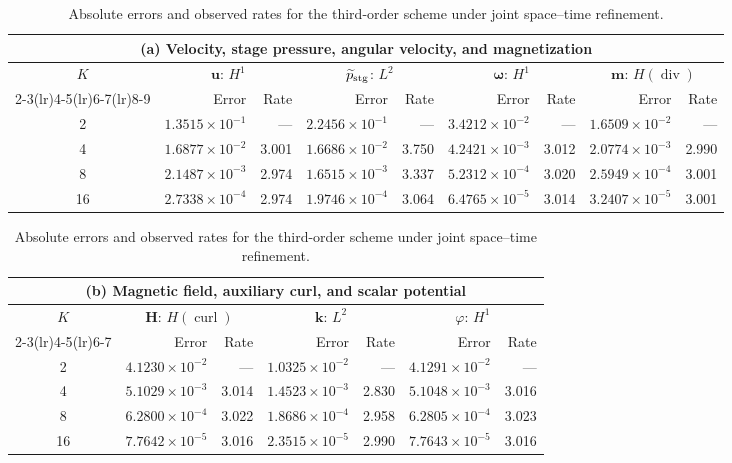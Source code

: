\documentclass[11pt,a4paper]{article}
\newcommand{\bs}{\boldsymbol}
\DeclareMathOperator{\curl}{curl}
\DeclareMathOperator{\ddiv}{div}
\newcommand{\Div}{\ddiv}
\newcommand{\pp}{\widetilde p}
\theoremstyle{definition}
\numberwithin{equation}{section}
\begin{document}
\begin{table}[H]
\centering
\caption{Absolute errors and observed rates for the third-order scheme under joint space--time refinement.}
\label{tab:third-order-absolute-errors}
\begingroup
\small
\setlength{\tabcolsep}{3.5pt}
\renewcommand{\arraystretch}{1.10}
\begin{tabular}{@{}c*{8}{r}@{}}
\toprule
\multicolumn{9}{c}{(a) Velocity, stage pressure, angular velocity, and magnetization}\\
\midrule
$K$ & \multicolumn{2}{c}{$\bs u$: $H^1$} & \multicolumn{2}{c}{$\pp_{\rm stg}$: $L^2$} & \multicolumn{2}{c}{$\bs\omega$: $H^1$} & \multicolumn{2}{c}{$\bs m$: $H(\Div)$}\\
\cmidrule(lr){2-3}\cmidrule(lr){4-5}\cmidrule(lr){6-7}\cmidrule(lr){8-9}
 & Error & Rate & Error & Rate & Error & Rate & Error & Rate\\
\midrule
2 & $1.3515\!\times\!10^{-1}$ & --- & $2.2456\!\times\!10^{-1}$ & --- & $3.4212\!\times\!10^{-2}$ & --- & $1.6509\!\times\!10^{-2}$ & ---\\
4 & $1.6877\!\times\!10^{-2}$ & 3.001 & $1.6686\!\times\!10^{-2}$ & 3.750 & $4.2421\!\times\!10^{-3}$ & 3.012 & $2.0774\!\times\!10^{-3}$ & 2.990\\
8 & $2.1487\!\times\!10^{-3}$ & 2.974 & $1.6515\!\times\!10^{-3}$ & 3.337 & $5.2312\!\times\!10^{-4}$ & 3.020 & $2.5949\!\times\!10^{-4}$ & 3.001\\
16 & $2.7338\!\times\!10^{-4}$ & 2.974 & $1.9746\!\times\!10^{-4}$ & 3.064 & $6.4765\!\times\!10^{-5}$ & 3.014 & $3.2407\!\times\!10^{-5}$ & 3.001\\
\bottomrule
\end{tabular}
\par\medskip
\begin{tabular}{@{}c*{6}{r}@{}}
\toprule
\multicolumn{7}{c}{(b) Magnetic field, auxiliary curl, and scalar potential}\\
\midrule
$K$ & \multicolumn{2}{c}{$\bs H$: $H(\curl)$} & \multicolumn{2}{c}{$\bs k$: $L^2$} & \multicolumn{2}{c}{$\varphi$: $H^1$}\\
\cmidrule(lr){2-3}\cmidrule(lr){4-5}\cmidrule(lr){6-7}
 & Error & Rate & Error & Rate & Error & Rate\\
\midrule
2 & $4.1230\!\times\!10^{-2}$ & --- & $1.0325\!\times\!10^{-2}$ & --- & $4.1291\!\times\!10^{-2}$ & ---\\
4 & $5.1029\!\times\!10^{-3}$ & 3.014 & $1.4523\!\times\!10^{-3}$ & 2.830 & $5.1048\!\times\!10^{-3}$ & 3.016\\
8 & $6.2800\!\times\!10^{-4}$ & 3.022 & $1.8686\!\times\!10^{-4}$ & 2.958 & $6.2805\!\times\!10^{-4}$ & 3.023\\
16 & $7.7642\!\times\!10^{-5}$ & 3.016 & $2.3515\!\times\!10^{-5}$ & 2.990 & $7.7643\!\times\!10^{-5}$ & 3.016\\
\bottomrule
\end{tabular}
\endgroup
\end{table}
\end{document}
